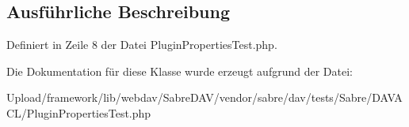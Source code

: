 \subsection{Ausführliche Beschreibung}


Definiert in Zeile 8 der Datei Plugin\+Properties\+Test.\+php.



Die Dokumentation für diese Klasse wurde erzeugt aufgrund der Datei\+:\begin{DoxyCompactItemize}
\item 
Upload/framework/lib/webdav/\+Sabre\+D\+A\+V/vendor/sabre/dav/tests/\+Sabre/\+D\+A\+V\+A\+C\+L/Plugin\+Properties\+Test.\+php\end{DoxyCompactItemize}
